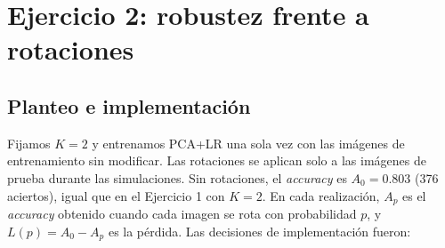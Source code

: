 \documentclass[11pt,a4paper]{article}
\newcommand{\acc}{\emph{accuracy}}
\begin{document}
\section{Ejercicio 2: robustez frente a rotaciones}
\subsection{Planteo e implementación}

Fijamos $K=2$ y entrenamos PCA+LR una sola vez con las imágenes de entrenamiento sin modificar. Las
rotaciones se aplican solo a las imágenes de prueba durante las simulaciones. Sin rotaciones, el \acc{} es
$A_0 = 0.803$ (376 aciertos), igual que en el Ejercicio 1 con $K=2$. En cada realización, $A_p$ es el \acc{}
obtenido cuando cada imagen se rota con probabilidad $p$, y $L(p) = A_0 - A_p$ es la pérdida. Las decisiones
de implementación fueron:
\end{document}
